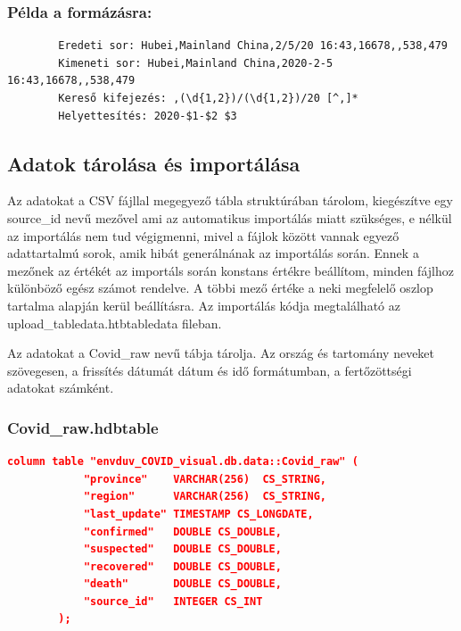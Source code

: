 \documentclass[12pt,a4papaer]{article}
\begin{document}
    \subsubsection{Példa a formázásra: }
        \begin{verbatim}
        Eredeti sor: Hubei,Mainland China,2/5/20 16:43,16678,,538,479
        Kimeneti sor: Hubei,Mainland China,2020-2-5 16:43,16678,,538,479
        Kereső kifejezés: ,(\d{1,2})/(\d{1,2})/20 [^,]*
        Helyettesítés: 2020-$1-$2 $3
        \end{verbatim}
    \subsection{Adatok tárolása és importálása}

    Az adatokat a CSV fájllal megegyező tábla struktúrában tárolom, kiegészítve egy source\_id nevű mezővel ami az automatikus importálás miatt szükséges, 
    e nélkül az importálás nem tud végigmenni, mivel a fájlok között vannak egyező adattartalmú sorok, amik hibát generálnának az importálás során.
    Ennek a mezőnek az értékét az importáls során konstans értékre beállítom, minden fájlhoz különböző egész számot rendelve.
    A többi mező értéke a neki megfelelő oszlop tartalma alapján kerül beállításra.
    Az importálás kódja megtalálható az upload\_tabledata.htbtabledata fileban.

    \par
    Az adatokat a Covid\_raw nevű tábja tárolja. Az ország és tartomány neveket szövegesen, a frissítés dátumát dátum és idő formátumban, a fertőzöttségi adatokat számként.

    \subsubsection{Covid\_raw.hdbtable}
    \begin{lstlisting}[language=json]
        column table "envduv_COVID_visual.db.data::Covid_raw" (
            "province"    VARCHAR(256)	CS_STRING,
            "region"      VARCHAR(256)	CS_STRING,
            "last_update" TIMESTAMP CS_LONGDATE,
            "confirmed"   DOUBLE CS_DOUBLE,
            "suspected"   DOUBLE CS_DOUBLE,
            "recovered"   DOUBLE CS_DOUBLE,
            "death"       DOUBLE CS_DOUBLE,
            "source_id"   INTEGER CS_INT
        );
    \end{lstlisting}
\end{document}
